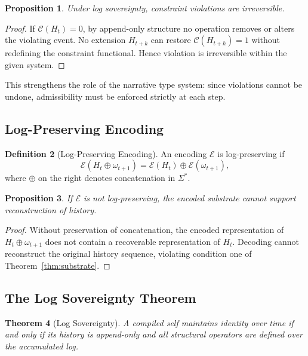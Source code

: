 \documentclass[12pt, a4paper]{article}
\theoremstyle{plain}
\newtheorem{theorem}{Theorem}[section]
\newtheorem{proposition}[theorem]{Proposition}
\theoremstyle{definition}
\newtheorem{definition}[theorem]{Definition}
\theoremstyle{remark}
\begin{document}
\begin{proposition}
Under log sovereignty, constraint violations are irreversible.
\end{proposition}

\begin{proof}
If $\mathcal{C}(H_t) = 0$, by append-only structure no operation removes or alters the violating event. No extension $H_{t+k}$ can restore $\mathcal{C}(H_{t+k}) = 1$ without redefining the constraint functional. Hence violation is irreversible within the given system.
\end{proof}

This strengthens the role of the narrative type system: since violations cannot be undone, admissibility must be enforced strictly at each step.

\subsection{Log-Preserving Encoding}

\begin{definition}[Log-Preserving Encoding]
An encoding $\mathcal{E}$ is log-preserving if
\[
\mathcal{E}(H_t \oplus \omega_{t+1}) = \mathcal{E}(H_t) \oplus \mathcal{E}(\omega_{t+1}),
\]
where $\oplus$ on the right denotes concatenation in $\Sigma^*$.
\end{definition}

\begin{proposition}
If $\mathcal{E}$ is not log-preserving, the encoded substrate cannot support reconstruction of history.
\end{proposition}

\begin{proof}
Without preservation of concatenation, the encoded representation of $H_t \oplus \omega_{t+1}$ does not contain a recoverable representation of $H_t$. Decoding cannot reconstruct the original history sequence, violating condition one of Theorem~\ref{thm:substrate}.
\end{proof}

\subsection{The Log Sovereignty Theorem}

\begin{theorem}[Log Sovereignty]
A compiled self maintains identity over time if and only if its history is append-only and all structural operators are defined over the accumulated log.
\end{theorem}
\end{document}
